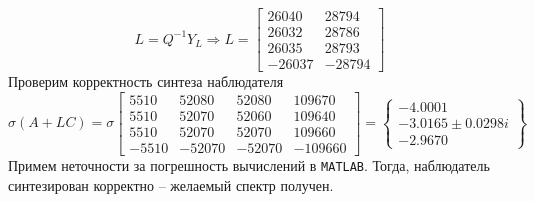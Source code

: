 \documentclass[a4paper, 12pt]{article}
\begin{document}
    $$
    L=Q^{-1}Y_L\Rightarrow L=\begin{bmatrix}
        26040    &28794\\
        26032    &28786\\
        26035    &28793\\
       -26037   &-28794
    \end{bmatrix}
    $$
    Проверим корректность синтеза наблюдателя
    $$
    \sigma\left(A+LC\right)=\sigma\begin{bmatrix}
 5510	 &52080	 &52080	 &109670\\
 5510	 &52070	 &52060	 &109640\\
 5510	 &52070	 &52070	 &109660\\
-5510	&-52070	&-52070	&-109660
    \end{bmatrix}=\left\{\begin{matrix}
-4.0001\\
-3.0165\pm 0.0298i\\
-2.9670
    \end{matrix}\right\}
    $$
    Примем неточности за погрешность вычислений в \texttt{MATLAB}. Тогда, наблюдатель синтезирован корректно
    -- желаемый спектр получен.
\end{document}
